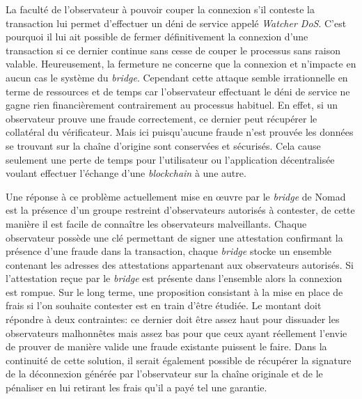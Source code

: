 La faculté de l’observateur à pouvoir couper la connexion s’il conteste la transaction lui permet d’effectuer un déni de service appelé \textit{Watcher DoS}. C’est pourquoi il lui ait possible de fermer définitivement la connexion d’une transaction si ce dernier continue sans cesse de couper le processus sans raison valable. Heureusement, la fermeture ne concerne que la connexion et n’impacte en aucun cas le système du \textit{bridge}. Cependant cette attaque semble irrationnelle en terme de ressources et de temps car l’observateur effectuant le déni de service ne gagne rien financièrement contrairement au processus habituel. En effet, si un observateur prouve une fraude correctement, ce dernier peut récupérer le collatéral du vérificateur. Mais ici puisqu’aucune fraude n’est prouvée les données se trouvant sur la chaîne d’origine sont conservées et sécurisés. Cela cause seulement une perte de temps pour l’utilisateur ou l’application décentralisée voulant effectuer l'échange d’une \textit{blockchain} à une autre.

Une réponse à ce problème actuellement mise en œuvre par le \textit{bridge} de Nomad est la présence d’un groupe restreint d’observateurs autorisés à contester, de cette manière il est facile de connaître les observateurs malveillants. Chaque observateur possède une clé permettant de signer une attestation confirmant la présence d’une fraude dans la transaction, chaque \textit{bridge} stocke un ensemble contenant les adresses des attestations appartenant aux observateurs autorisés. Si l’attestation reçue par le \textit{bridge} est présente dans l’ensemble alors la connexion est rompue\cite{NomadDocsWatcher}.
Sur le long terme, une proposition consistant à la mise en place de frais si l’on souhaite contester est en train d’être étudiée. Le montant doit répondre à deux contraintes: ce dernier doit être assez haut pour dissuader les observateurs malhonnêtes mais assez bas pour que ceux ayant réellement l’envie de prouver de manière valide une fraude existante puissent le faire. Dans la continuité de cette solution, il serait également possible de récupérer la signature de la déconnexion générée par l’observateur sur la chaîne originale et de le pénaliser en lui retirant les frais qu’il a payé tel une garantie\cite{OptimisticBhuptani}.

